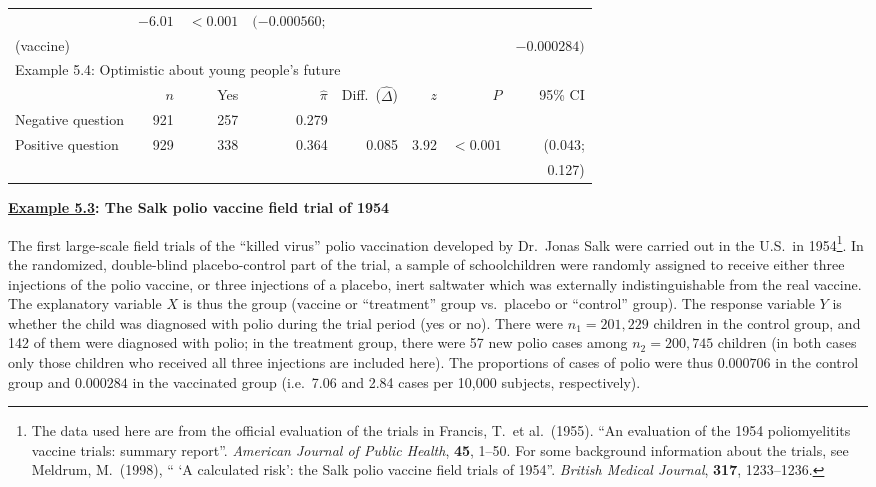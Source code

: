 \begin{table}[t]
\begin{small}
\begin{center}
\begin{tabular}{|lrrrrrrr|}
& $-6.01$& $<0.001$&  $(-0.000560;$ \\
(vaccine)
& & & & & & & $-0.000284)$ \\[1ex] \hline
\multicolumn{8}{|l|}{\rule[1mm]{0mm}{3mm}Example 5.4: Optimistic about young people's future}\\
& $n$ & Yes & $\hat{\pi}$ & Diff.\ ($\hat{\Delta}$)& $z$ & $P$ & 95\% CI \\ \hline
\hspace*{.5em}\rule[1mm]{0mm}{3mm}Negative question
& 921 & 257& 0.279 & & & &   \\
\hspace*{.5em}Positive question
& 929 & 338& 0.364 & 0.085 & 3.92& $<0.001$& (0.043;\\
& & & & & & & 0.127) \\
\hline
\end{tabular}
\end{center}
\end{small}
\end{table}

\textbf{\underline{Example 5.3}:
The Salk polio vaccine field trial of 1954}

The first large-scale field trials of the ``killed virus'' polio
vaccination developed by Dr.\ Jonas Salk were carried out in the U.S.\
in 1954\footnote{The data used here are from the official evaluation of
the trials in Francis, T.\ et al.\ (1955). ``An evaluation of the 1954
poliomyelitits vaccine trials: summary report''. \emph{American Journal
of Public Health}, \textbf{45}, 1--50. For some background information
about the trials, see Meldrum, M.\ (1998), `` `A calculated risk': the
Salk polio vaccine field trials of 1954''. \emph{British Medical
Journal}, \textbf{317}, 1233--1236.}. In the randomized, double-blind
placebo-control part of the trial, a sample of schoolchildren were
randomly assigned to receive either three injections of the polio
vaccine, or three injections of a placebo, inert saltwater which was
externally indistinguishable from the real vaccine. The explanatory
variable $X$ is thus the group (vaccine or ``treatment'' group vs.\
placebo or ``control'' group). The response  variable $Y$ is whether the
child was diagnosed with polio during the trial period (yes or no).
There were $n_{1}=201,229$ children in the control group, and 142 of
them were diagnosed with polio; in the treatment group, there were 57
new polio cases among $n_{2}=200,745$ children (in both cases only those
children who received all three injections are included here). The
proportions of cases of polio were thus
$0.000706$ in the control group
and $0.000284$ in the vaccinated group (i.e.\
7.06 and 2.84 cases per 10,000
subjects, respectively).

